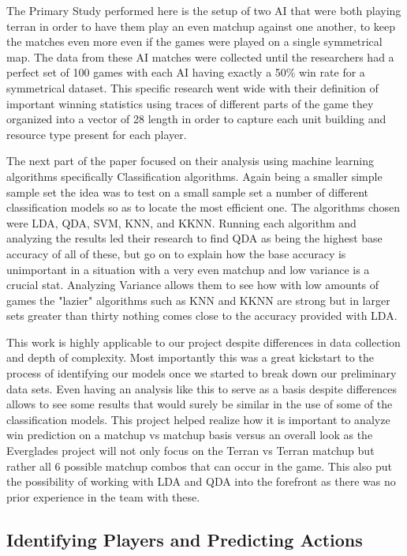\documentclass[a4paper,12pt]{report}
\begin{document}
The Primary Study performed here is the setup of two AI that were both playing terran in order to have them play an even matchup against one another, to keep the matches even more even if the games were played on a single symmetrical map. The data from these AI matches were collected until the researchers had a perfect set of 100 games with each AI having exactly a 50\% win rate for a symmetrical dataset. This specific research went wide with their definition of important winning statistics using traces of different parts of the game they organized into a vector of 28 length in order to capture each unit building and resource type present for each player. 

The next part of the paper focused on their analysis using machine learning algorithms specifically Classification algorithms. Again being a smaller simple sample set the idea was to test on a small sample set a number of different classification models so as to locate the most efficient one. The algorithms chosen were LDA, QDA, SVM, KNN, and KKNN. Running each algorithm and analyzing the results led their research to find QDA as being the highest base accuracy of all of these, but go on to explain how the base accuracy is unimportant in a situation with a very even matchup and low variance is a crucial stat. Analyzing Variance allows them to see how with low amounts of games the "lazier" algorithms such as KNN and KKNN are strong but in larger sets greater than thirty nothing comes close to the accuracy provided with LDA.

This work is highly applicable to our project despite differences in data collection and depth of complexity. Most importantly this was a great kickstart to the process of identifying our models once we started to break down our preliminary data sets. Even having an analysis like this to serve as a basis despite differences allows to see some results that would surely be similar in the use of some of the classification models. This project helped realize how it is important to analyze win prediction on a matchup vs matchup basis versus an overall look as the Everglades project will not only focus on the Terran vs Terran matchup but rather all 6 possible matchup combos that can occur in the game. This also put the possibility of working with LDA and QDA into the forefront as there was no prior experience in the team with these. 

\subsection{Identifying Players and Predicting Actions}
\end{document}

